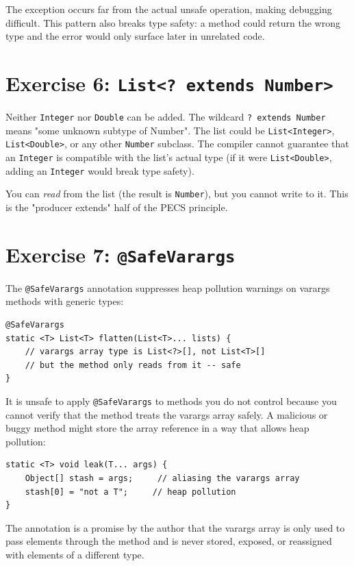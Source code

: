 \documentclass[twoside=false,DIV=14]{scrartcl}
\begin{document}
The exception occurs far from the actual unsafe operation, making debugging difficult.  This pattern also breaks type safety: a method could return the wrong type and the error would only surface later in unrelated code.

\section*{Exercise 6: \texttt{List<? extends Number>}}

Neither \texttt{Integer} nor \texttt{Double} can be added.  The wildcard \texttt{? extends Number} means "some unknown subtype of Number".  The list could be \texttt{List<Integer>}, \texttt{List<Double>}, or any other \texttt{Number} subclass.  The compiler cannot guarantee that an \texttt{Integer} is compatible with the list's actual type (if it were \texttt{List<Double>}, adding an \texttt{Integer} would break type safety).

You can \emph{read} from the list (the result is \texttt{Number}), but you cannot write to it.  This is the "producer extends" half of the PECS principle.

\section*{Exercise 7: \texttt{@SafeVarargs}}

The \texttt{@SafeVarargs} annotation suppresses heap pollution warnings on varargs methods with generic types:

\begin{lstlisting}
@SafeVarargs
static <T> List<T> flatten(List<T>... lists) {
    // varargs array type is List<?>[], not List<T>[]
    // but the method only reads from it -- safe
}
\end{lstlisting}

It is unsafe to apply \texttt{@SafeVarargs} to methods you do not control because you cannot verify that the method treats the varargs array safely.  A malicious or buggy method might store the array reference in a way that allows heap pollution:

\begin{lstlisting}
static <T> void leak(T... args) {
    Object[] stash = args;     // aliasing the varargs array
    stash[0] = "not a T";     // heap pollution
}
\end{lstlisting}

The annotation is a promise by the author that the varargs array is only used to pass elements through the method and is never stored, exposed, or reassigned with elements of a different type.
\end{document}
